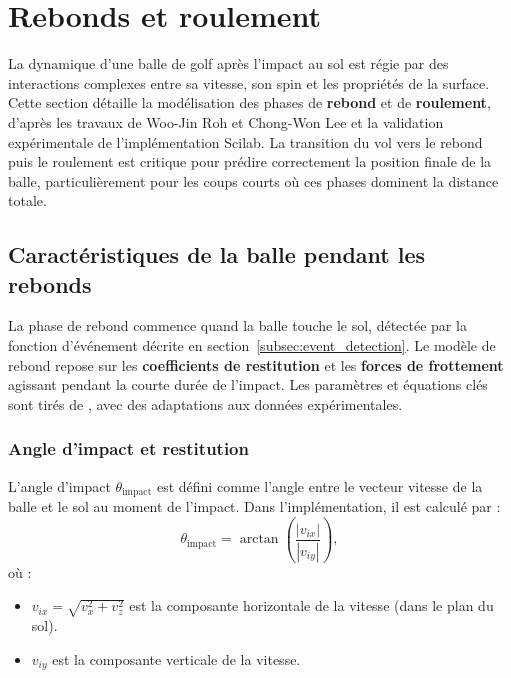\documentclass[10pt,a4paper]{report}
\begin{document}
\section{Rebonds et roulement}
\label{sec:bouncing_rolling}

La dynamique d'une balle de golf après l'impact au sol est régie par des interactions complexes entre sa vitesse, son spin et les propriétés de la surface. Cette section détaille la modélisation des phases de \textbf{rebond} et de \textbf{roulement}, d'après les travaux de Woo-Jin Roh et Chong-Won Lee \cite{rwlc2010} et la validation expérimentale de l'implémentation Scilab. La transition du vol vers le rebond puis le roulement est critique pour prédire correctement la position finale de la balle, particulièrement pour les coups courts où ces phases dominent la distance totale.


\subsection{Caractéristiques de la balle pendant les rebonds}
\label{subsec:bouncing_characteristics}

La phase de rebond commence quand la balle touche le sol, détectée par la fonction d'événement décrite en section~\ref{subsec:event_detection}. Le modèle de rebond repose sur les \textbf{coefficients de restitution} et les \textbf{forces de frottement} agissant pendant la courte durée de l'impact. Les paramètres et équations clés sont tirés de \cite{rwlc2010}, avec des adaptations aux données expérimentales.


\subsubsection{Angle d'impact et restitution}
\label{subsubsec:impact_angle}

L'angle d'impact $\theta_{\text{impact}}$ est défini comme l'angle entre le vecteur vitesse de la balle et le sol au moment de l'impact. Dans l'implémentation, il est calculé par :
\[
\theta_{\text{impact}} = \arctan\left(\frac{|v_{ix}|}{|v_{iy}|}\right),
\]
où :
\begin{itemize}
    \item $v_{ix} = \sqrt{v_x^2 + v_z^2}$ est la composante horizontale de la vitesse (dans le plan du sol).
    \item $v_{iy}$ est la composante verticale de la vitesse.
\end{itemize}
\end{document}
